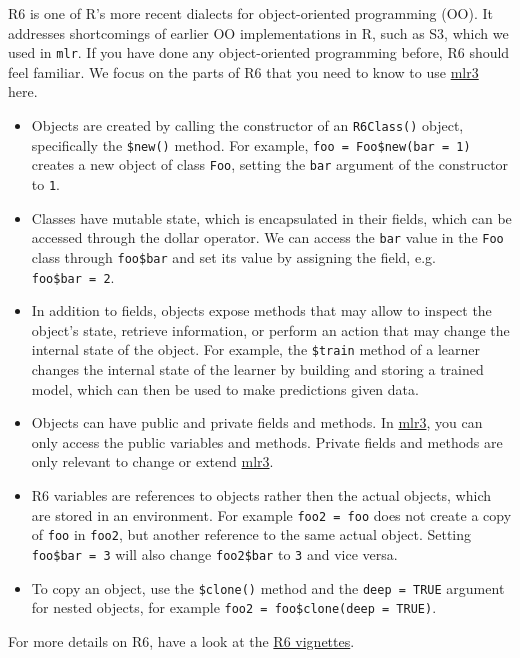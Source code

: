 \documentclass[
  11pt,
  parskip=half,
  DIV=calc,
  BCOR=10mm,
  x11names]{scrbook}
\providecommand{\tightlist}{%
  \setlength{\itemsep}{0pt}\setlength{\parskip}{0pt}}
\begin{document}
R6 is one of R's more recent dialects for object-oriented programming (OO).
It addresses shortcomings of earlier OO implementations in R, such as S3, which we used in \texttt{mlr}.
If you have done any object-oriented programming before, R6 should feel familiar.
We focus on the parts of R6 that you need to know to use \href{https://mlr3.mlr-org.com}{mlr3} here.

\begin{itemize}
\tightlist
\item
  Objects are created by calling the constructor of an \texttt{R6Class()} object, specifically the \texttt{\$new()} method.
  For example, \texttt{foo\ =\ Foo\$new(bar\ =\ 1)} creates a new object of class \texttt{Foo}, setting the \texttt{bar} argument of the constructor to \texttt{1}.
\item
  Classes have mutable state, which is encapsulated in their fields, which can be accessed through the dollar operator.
  We can access the \texttt{bar} value in the \texttt{Foo} class through \texttt{foo\$bar} and set its value by assigning the field, e.g. \texttt{foo\$bar\ =\ 2}.
\item
  In addition to fields, objects expose methods that may allow to inspect the object's state, retrieve information, or perform an action that may change the internal state of the object.
  For example, the \texttt{\$train} method of a learner changes the internal state of the learner by building and storing a trained model, which can then be used to make predictions given data.
\item
  Objects can have public and private fields and methods.
  In \href{https://mlr3.mlr-org.com}{mlr3}, you can only access the public variables and methods.
  Private fields and methods are only relevant to change or extend \href{https://mlr3.mlr-org.com}{mlr3}.
\item
  R6 variables are references to objects rather then the actual objects, which are stored in an environment.
  For example \texttt{foo2\ =\ foo} does not create a copy of \texttt{foo} in \texttt{foo2}, but another reference to the same actual object.
  Setting \texttt{foo\$bar\ =\ 3} will also change \texttt{foo2\$bar} to \texttt{3} and vice versa.
\item
  To copy an object, use the \texttt{\$clone()} method and the \texttt{deep\ =\ TRUE} argument for nested objects, for example \texttt{foo2\ =\ foo\$clone(deep\ =\ TRUE)}.
\end{itemize}

For more details on R6, have a look at the \href{https://r6.r-lib.org/}{R6 vignettes}.
\end{document}
